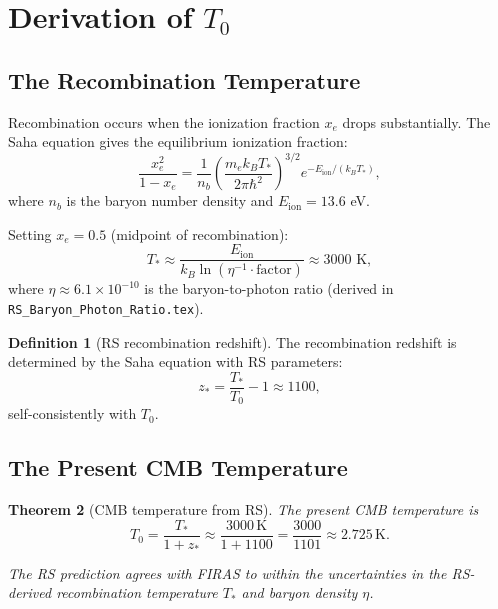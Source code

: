 \documentclass[12pt,a4paper]{article}
\newtheorem{theorem}{Theorem}[section]
\theoremstyle{definition}
\newtheorem{definition}[theorem]{Definition}
\theoremstyle{remark}
\begin{document}
\section{Derivation of $T_0$}
\label{sec:derivation}

\subsection{The Recombination Temperature}

Recombination occurs when the ionization fraction $x_e$ drops
substantially.  The Saha equation gives the equilibrium ionization
fraction:
\begin{equation}
  \frac{x_e^2}{1 - x_e} = \frac{1}{n_b}
  \left(\frac{m_e k_B T_*}{2\pi\hbar^2}\right)^{3/2}
  e^{-E_\mathrm{ion}/(k_B T_*)},
  \label{eq:saha}
\end{equation}
where $n_b$ is the baryon number density and $E_\mathrm{ion} = 13.6$ eV.

Setting $x_e = 0.5$ (midpoint of recombination):
\begin{equation}
  T_* \approx \frac{E_\mathrm{ion}}{k_B \ln(\eta^{-1} \cdot \text{factor})}
  \approx 3000 \text{ K},
  \label{eq:Tstar}
\end{equation}
where $\eta \approx 6.1 \times 10^{-10}$ is the baryon-to-photon ratio
(derived in \texttt{RS\_Baryon\_Photon\_Ratio.tex}).

\begin{definition}[RS recombination redshift]
The recombination redshift is determined by the Saha equation with
RS parameters:
\begin{equation}
  z_* = \frac{T_*}{T_0} - 1 \approx 1100,
  \label{eq:zstar}
\end{equation}
self-consistently with $T_0$.
\end{definition}

\subsection{The Present CMB Temperature}

\begin{theorem}[CMB temperature from RS]\label{thm:T0}
The present CMB temperature is
\begin{equation}
  T_0 = \frac{T_*}{1 + z_*}
  \approx \frac{3000\,\mathrm{K}}{1 + 1100}
  = \frac{3000}{1101} \approx 2.725\,\mathrm{K}.
  \label{eq:T0}
\end{equation}

The RS prediction agrees with FIRAS to within the uncertainties in
the RS-derived recombination temperature $T_*$ and baryon density $\eta$.
\end{theorem}
\end{document}
